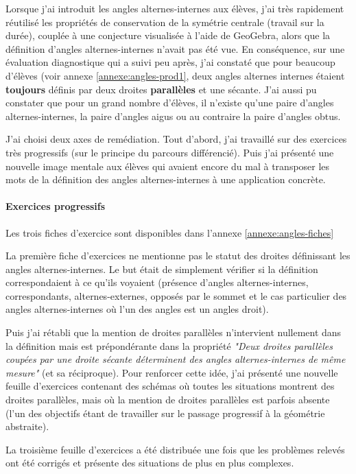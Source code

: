 Lorsque j'ai introduit les angles alternes-internes aux élèves, j'ai très rapidement réutilisé les propriétés de conservation de la symétrie centrale (travail sur la durée), couplée à une conjecture visualisée à l'aide de GeoGebra, alors que la définition d'angles alternes-internes n'avait pas été vue. En conséquence, sur une évaluation diagnostique qui a suivi peu après, j'ai constaté que pour beaucoup d'élèves (voir annexe \ref{annexe:angles-prod1}, deux angles alternes internes étaient \textbf{toujours} définis par deux droites \textbf{parallèles} et une sécante. J'ai aussi pu constater que pour un grand nombre d'élèves, il n'existe qu'une paire d'angles alternes-internes, la paire d'angles aigus ou au contraire la paire d'angles obtus.

J'ai choisi deux axes de remédiation. Tout d'abord, j'ai travaillé sur des exercices très progressifs (sur le principe du parcours différencié). Puis j'ai présenté une nouvelle image mentale aux élèves qui avaient encore du mal à transposer les mots de la définition des angles alternes-internes à une application concrète.

\paragraph{Exercices progressifs}

Les trois fiches d'exercice sont disponibles dans l'annexe \ref{annexe:angles-fiches}

La première fiche d'exercices ne mentionne pas le statut des droites définissant les angles alternes-internes. Le but était de simplement vérifier si la définition correspondaient à ce qu'ils voyaient (présence d'angles alternes-internes, correspondants, alternes-externes, opposés par le sommet et le cas particulier des angles alternes-internes où l'un des angles est un angles droit).

Puis j'ai rétabli que la mention de droites parallèles n'intervient nullement dans la définition mais est prépondérante dans la propriété \textit{"Deux droites parallèles coupées par une droite sécante déterminent des angles alternes-internes de même mesure"} (et sa réciproque). Pour renforcer cette idée, j'ai présenté une nouvelle feuille d'exercices contenant des schémas où toutes les situations montrent des droites parallèles, mais où la mention de droites parallèles est parfois absente (l'un des objectifs étant de travailler sur le passage progressif à la géométrie abstraite).

La troisième feuille d'exercices a été distribuée une fois que les problèmes relevés ont été corrigés et présente des situations de plus en plus complexes.


